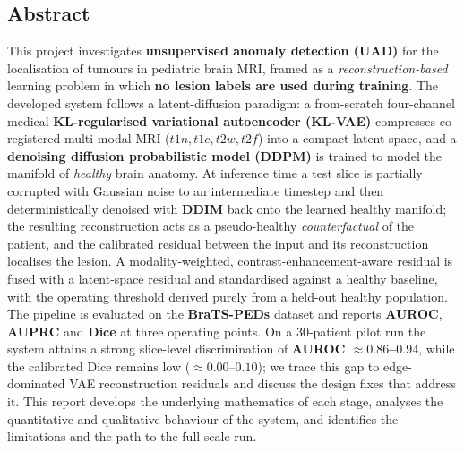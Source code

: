 \documentclass[12pt, a4paper]{article}
\begin{document}
\thispagestyle{empty}
\vspace*{\fill}
\begin{center}
    \begin{minipage}{0.85\textwidth}
        \section*{Abstract}
        This project investigates \textbf{unsupervised anomaly detection (UAD)} for the localisation of tumours in pediatric brain MRI, framed as a \textit{reconstruction-based} learning problem in which \textbf{no lesion labels are used during training}. The developed system follows a latent-diffusion paradigm: a from-scratch four-channel medical \textbf{KL-regularised variational autoencoder (KL-VAE)} compresses co-registered multi-modal MRI ($t1n, t1c, t2w, t2f$) into a compact latent space, and a \textbf{denoising diffusion probabilistic model (DDPM)} is trained to model the manifold of \emph{healthy} brain anatomy. At inference time a test slice is partially corrupted with Gaussian noise to an intermediate timestep and then deterministically denoised with \textbf{DDIM} back onto the learned healthy manifold; the resulting reconstruction acts as a pseudo-healthy \emph{counterfactual} of the patient, and the calibrated residual between the input and its reconstruction localises the lesion. A modality-weighted, contrast-enhancement-aware residual is fused with a latent-space residual and standardised against a healthy baseline, with the operating threshold derived purely from a held-out healthy population. The pipeline is evaluated on the \textbf{BraTS-PEDs} dataset and reports \textbf{AUROC}, \textbf{AUPRC} and \textbf{Dice} at three operating points. On a 30-patient pilot run the system attains a strong slice-level discrimination of \textbf{AUROC $\approx 0.86$--$0.94$}, while the calibrated Dice remains low ($\approx 0.00$--$0.10$); we trace this gap to edge-dominated VAE reconstruction residuals and discuss the design fixes that address it. This report develops the underlying mathematics of each stage, analyses the quantitative and qualitative behaviour of the system, and identifies the limitations and the path to the full-scale run.
    \end{minipage}
\end{center}
\vspace*{\fill}
\clearpage


\end{document}
